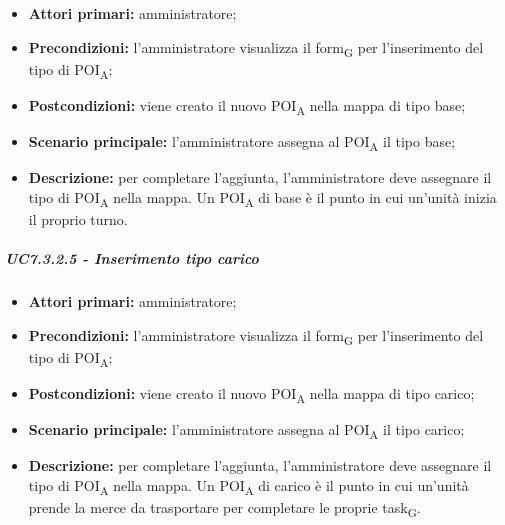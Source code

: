 \begin{itemize}

   \item   \textbf{Attori primari:} amministratore;

   \item   \textbf{Precondizioni:} l'amministratore visualizza il form\textsubscript{G} per l'inserimento del tipo di POI\textsubscript{A};

   \item   \textbf{Postcondizioni:} viene creato il nuovo POI\textsubscript{A} nella mappa di tipo base; 

   \item   \textbf{Scenario principale:} l'amministratore assegna al POI\textsubscript{A} il tipo base;

   \item   \textbf{Descrizione:} per completare l'aggiunta, l'amministratore deve assegnare il tipo di POI\textsubscript{A} nella mappa. Un POI\textsubscript{A} di base è il punto in cui un'unità inizia il proprio turno.



\end{itemize}



\subparagraph{UC7.3.2.5 - Inserimento tipo carico}

\begin{itemize}

   \item   \textbf{Attori primari:} amministratore;

   \item   \textbf{Precondizioni:} l'amministratore visualizza il form\textsubscript{G} per l'inserimento del tipo di POI\textsubscript{A};

   \item   \textbf{Postcondizioni:} viene creato il nuovo POI\textsubscript{A} nella mappa di tipo carico; 

 \item   \textbf{Scenario principale:} l'amministratore assegna al POI\textsubscript{A} il tipo carico;

   \item   \textbf{Descrizione:} per completare l'aggiunta, l'amministratore deve assegnare il tipo di POI\textsubscript{A} nella mappa. Un POI\textsubscript{A} di carico è il punto in cui un'unità prende la merce da trasportare per completare le proprie task\textsubscript{G}.



\end{itemize}



